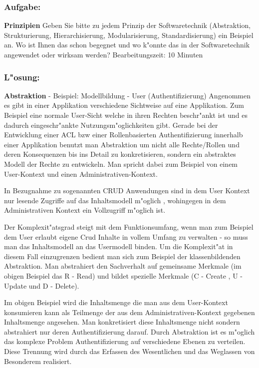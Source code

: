 \subsubsection*{Aufgabe:}

\begin{framed}
\textbf{Prinzipien}
\smallbreak
Geben Sie bitte zu jedem Prinzip der Softwaretechnik (Abstraktion, Strukturierung, Hierarchisierung, Modularisierung, Standardisierung) ein Beispiel an. Wo ist Ihnen das schon begegnet und wo k"onnte das in der Softwaretechnik angewendet oder wirksam werden?
\bigbreak
\small Bearbeitungszeit: 10 Minuten
\end{framed}
\bigbreak
\bigbreak
\subsubsection*{L"osung:}
\textbf{Abstraktion}
- Beispiel: Modellbildung - User (Authentifizierung)
\smallbreak
Angenommen es gibt in einer Applikation verschiedene Sichtweise auf eine Applikation.
\smallbreak
Zum Beispiel eine normale User-Sicht welche in ihren Rechten beschr"ankt ist und es dadurch eingeschr"ankte Nutzungsm"oglichkeiten gibt.
Gerade bei der Entwicklung einer ACL bzw einer Rollenbasierten Authentifizierung innerhalb einer Applikation benutzt man Abstraktion um nicht alle Rechte/Rollen und deren Konsequenzen bis ins Detail zu konkretisieren, sondern ein abstraktes Modell der Rechte zu entwickeln.
Man spricht dabei zum Beispiel von einem User-Kontext und einen Administrativen-Kontext.

In Bezugnahme zu sogenannten CRUD Anwendungen sind in dem User Kontext nur lesende Zugriffe auf das Inhaltsmodell m"oglich , wohingegen in dem Administrativen Kontext ein Vollzugriff m"oglich ist.

Der Komplexit"atsgrad steigt mit dem Funktionsumfang, wenn man zum Beispiel dem User erlaubt eigene Crud Inhalte in vollem Umfang zu verwalten - so muss man das Inhaltsmodell an das Usermodell binden.
Um die Komplexit"at in diesem Fall einzugrenzen bedient man sich zum Beispiel der klassenbildenden Abstraktion. Man abstrahiert den Sachverhalt auf gemeinsame Merkmale (im obigen Beispiel das R - Read) und bildet spezielle Merkmale (C - Create , U - Update und D - Delete).

Im obigen Beispiel wird die Inhaltsmenge die man aus dem User-Kontext konsumieren kann als Teilmenge der aus dem Administrativen-Kontext gegebenen Inhaltsmenge angesehen.
Man konkretisiert diese Inhaltsmenge nicht sondern abstrahiert nur deren Authentifizierung darauf. Durch Abstraktion ist es m"oglich das komplexe Problem Authentifizierung auf verschiedene Ebenen zu verteilen. Diese Trennung wird durch das Erfassen des Wesentlichen und das Weglassen von Besonderem realisiert.



